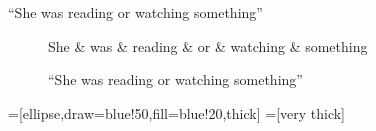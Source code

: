 \documentclass[11pt,a4paper]{article}
\begin{document}
``She was reading or watching something''

\begin{figure}[h]
\centering
\begin{dependency}
\begin{deptext}[column sep=1em]
She \& was \& reading \& or \& watching \& something  \\
\end{deptext}
\end{dependency}
\caption{``She was reading or watching something''}
\end{figure}
    
    
=[ellipse,draw=blue!50,fill=blue!20,thick]
=[very thick]
\end{document}
